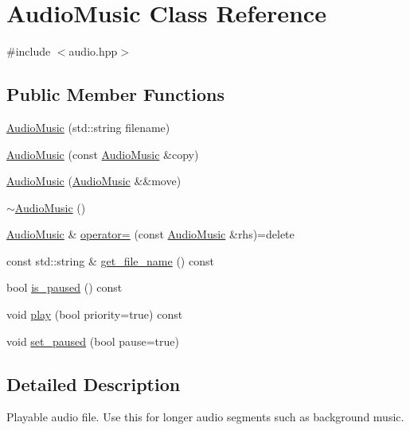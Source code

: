 \hypertarget{class_audio_music}{}\section{Audio\+Music Class Reference}
\label{class_audio_music}


{\ttfamily \#include $<$audio.\+hpp$>$}

\subsection*{Public Member Functions}
\begin{DoxyCompactItemize}
\item 
\mbox{\hyperlink{class_audio_music_a260b6ddf241e3f1e865a49309aa12572}{Audio\+Music}} (std\+::string filename)
\item 
\mbox{\hyperlink{class_audio_music_a742e8a6822342b8de08175e3948e5830}{Audio\+Music}} (const \mbox{\hyperlink{class_audio_music}{Audio\+Music}} \&copy)
\item 
\mbox{\hyperlink{class_audio_music_a55779c2cc75a89cf808d92e313d80ae8}{Audio\+Music}} (\mbox{\hyperlink{class_audio_music}{Audio\+Music}} \&\&move)
\item 
\mbox{\hyperlink{class_audio_music_ab2d3d7df8441d2cca3933a34b1d49e8e}{$\sim$\+Audio\+Music}} ()
\item 
\mbox{\hyperlink{class_audio_music}{Audio\+Music}} \& \mbox{\hyperlink{class_audio_music_a9487a5b790ede77cc96efd6e70322253}{operator=}} (const \mbox{\hyperlink{class_audio_music}{Audio\+Music}} \&rhs)=delete
\item 
const std\+::string \& \mbox{\hyperlink{class_audio_music_a794b5133068bacd9d5954316c466e781}{get\+\_\+file\+\_\+name}} () const
\item 
bool \mbox{\hyperlink{class_audio_music_a103d6a71de74441ad5b63fec5f50d656}{is\+\_\+paused}} () const
\item 
void \mbox{\hyperlink{class_audio_music_a9867971e26b4d081936287af1923fd1a}{play}} (bool priority=true) const
\item 
void \mbox{\hyperlink{class_audio_music_a5de1c2fc9f565af444c48b85b56d7c8f}{set\+\_\+paused}} (bool pause=true)
\end{DoxyCompactItemize}


\subsection{Detailed Description}
Playable audio file. Use this for longer audio segments such as background music. 

